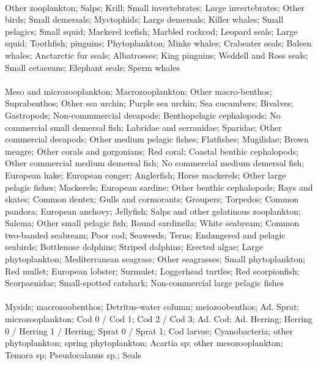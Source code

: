  \\
\hline
Other zooplankton; Salps; Krill; Small invertebrates; Large invertebrates; Other birds; Small demersals; Myctophids; Large demersals; Killer whales; Small pelagics; Small squid; Mackerel icefish; Marbled rockcod; Leopard seals; Large squid; Toothfish; pinguins; Phytoplankton; Minke whales; Crabeater seals; Baleen whales; Anctarctic fur seals; Albatrosses; King pinguins; Weddell and Ross seals; Small cetaceans; Elephant seals; Sperm whales\\
\fullhline
\hline
{} \\
\hline
Meso and microzooplankton; Macrozooplankton; Other macro-benthos; Suprabenthos; Other sea urchin; Purple sea urchin; Sea cucumbers; Bivalves; Gastropods; Non-commmercial decapods; Benthopelagic cephalopods; No commercial small demersal fish; Labridae and serranidae; Sparidae; Other commercial decapods; Other medium pelagic fishes; Flatfishes; Mugilidae; Brown meagre; Other corals and gorgonians; Red coral; Coastal benthic cephalopods; Other commercial medium demersal fish; No commercial medium demersal fish; European hake; European conger; Anglerfish; Horse mackerels; Other large pelagic fishes; Mackerels; European sardine; Other benthic cephalopods; Rays and skates; Common dentex; Gulls and cormorants; Groupers; Torpedos; Common pandora; European anchovy; Jellyfish; Salps and other gelatinous zooplankton; Salema; Other small pelagic fish; Round sardinella; White seabream; Common two-banded seabream; Poor cod; Seaweeds; Terns; Endangered and pelagic seabirds; Bottlenose dolphins; Striped dolphins; Erected algae; Large phytoplankton; Mediterranean seagrass; Other seagrasses; Small phytoplankton; Red mullet; European lobster; Surmulet; Loggerhead turtles; Red scorpionfish; Scorpaenidae; Small-spotted catshark; Non-commercial large pelagic fishes\\
\fullhline
\hline
{} \\
\hline
Mysids; macrozoobenthos; Detritus-water column; meiozoobenthos; Ad. Sprat; microzooplankton; Cod 0 / Cod 1; Cod 2 / Cod 3; Ad. Cod; Ad. Herring; Herring 0 / Herring 1 / Herring; Sprat 0 / Sprat 1; Cod larvae; Cyanobacteria; other phytoplankton; spring phytoplankton; Acartia sp; other mesozooplankton; Temora sp; Pseudocalanus sp.; Seals\\
\fullhline
\hline

